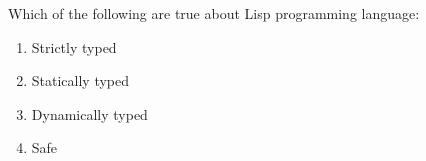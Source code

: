 \question Which of the following are true about Lisp programming language:
\begin{enumerate}
\item Strictly typed
\item Statically typed
\item Dynamically typed
\item Safe
\end{enumerate}